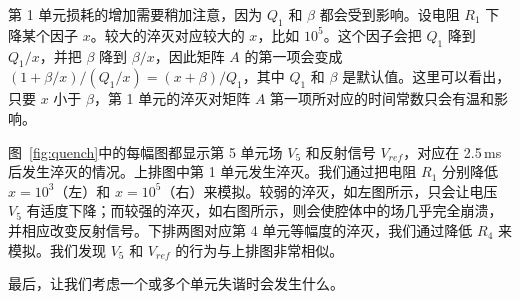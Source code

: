 \documentclass[12pt]{article}
\begin{document}
第 1 单元损耗的增加需要稍加注意，因为 $Q_1$ 和 $\beta$ 都会受到影响。设电阻 $R_1$ 下降某个因子 $x$。较大的淬灭对应较大的 $x$，比如 $10^5$。这个因子会把 $Q_1$ 降到 $Q_1/x$，并把 $\beta$ 降到 $\beta/x$，因此矩阵 $A$ 的第一项会变成 $(1+\beta/x)/(Q_1/x)=(x+\beta)/Q_1$，其中 $Q_1$ 和 $\beta$ 是默认值。这里可以看出，只要 $x$ 小于 $\beta$，第 1 单元的淬灭对矩阵 $A$ 第一项所对应的时间常数只会有温和影响。
\par
图~\ref{fig:quench}中的每幅图都显示第 5 单元场 $V_5$ 和反射信号 $V_{ref}$，对应在 2.5\,ms 后发生淬灭的情况。上排图中第 1 单元发生淬灭。我们通过把电阻 $R_1$ 分别降低 $x=10^3$（左）和 $x=10^5$（右）来模拟。较弱的淬灭，如左图所示，只会让电压 $V_5$ 有适度下降；而较强的淬灭，如右图所示，则会使腔体中的场几乎完全崩溃，并相应改变反射信号。下排两图对应第 4 单元等幅度的淬灭，我们通过降低 $R_4$ 来模拟。我们发现 $V_5$ 和 $V_{ref}$ 的行为与上排图非常相似。
\par
最后，让我们考虑一个或多个单元失谐时会发生什么。
%
\end{document}
